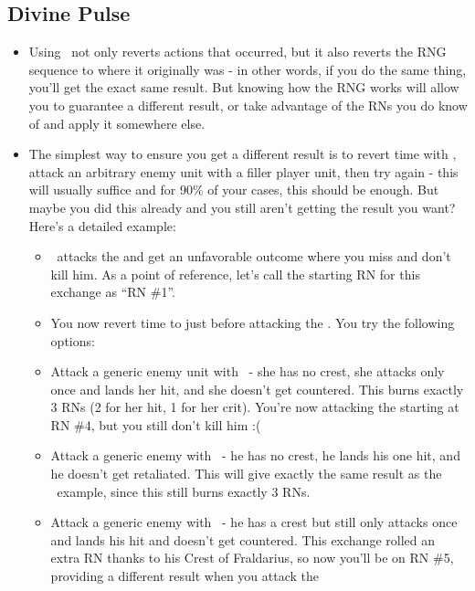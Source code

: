 \subsection*{Divine Pulse}
\begin{itemize}
\item Using \divinepulse\ not only reverts actions that occurred, but it also reverts the RNG sequence to where it originally was - in other words, if you do the same thing, you'll get the exact same result. But knowing how the RNG works will allow you to guarantee a different result, or take advantage of the RNs you do know of and apply it somewhere else. 

\item The simplest way to ensure you get a different result is to revert time with \divinepulse, attack an arbitrary enemy unit with a filler player unit, then try again - this will usually suffice and for 90\% of your cases, this should be enough. But maybe you did this already and you still aren't getting the result you want? Here's a detailed example:
\begin{itemize}
\item \Byleth\ attacks the  and get an unfavorable outcome where you miss and don't kill him. As a point of reference, let's call the starting RN for this exchange as ``RN \#1''.

\item You now revert time to just before attacking the . You try the following options:

\item Attack a generic enemy unit with \Shamir\ - she has no crest, she attacks only once and lands her hit, and she doesn't get countered. This burns exactly 3 RNs (2 for her hit, 1 for her crit). You're now attacking the  starting at RN \#4, but you still don't kill him :(

\item Attack a generic enemy with \Hubert\ - he has no crest, he lands his one hit, and he doesn't get retaliated. This will give exactly the same result as the \Shamir\ example, since this still burns exactly 3 RNs.

\item Attack a generic enemy with \Felix\ - he has a crest but still only attacks once and lands his hit and doesn't get countered. This exchange rolled an extra RN thanks to his Crest of Fraldarius, so now you'll be on RN \#5, providing a different result when you attack the 


\end{itemize}
\end{itemize}
